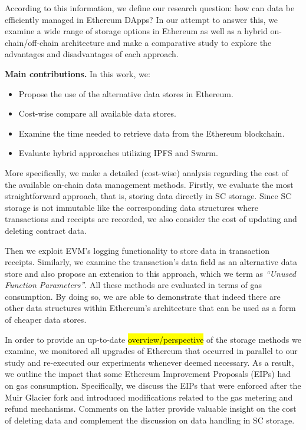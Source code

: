 According to this information, we define our research question: how can data be efficiently managed in Ethereum DApps?
In our attempt to answer this, we examine a wide range of storage options in Ethereum as well as a hybrid on-chain/off-chain architecture and make a comparative study to explore the advantages and disadvantages of each approach. 

{\bf Main contributions.} In this work, we:
\begin{itemize}[topsep=0pt, itemsep=0pt]
\item{Propose the use of the alternative data stores in Ethereum.}
\item{Cost-wise compare all available data stores.}
\item{Examine the time needed to retrieve data from the Ethereum blockchain.}
\item{Evaluate hybrid approaches utilizing IPFS and Swarm.}
\end{itemize}

More specifically, we make a detailed (cost-wise) analysis regarding the cost of the available on-chain data management methods. Firstly, we evaluate the most straightforward approach, that is, storing data directly in SC storage. Since SC storage is not immutable like the corresponding data structures where transactions and receipts are recorded, we also consider the cost of updating and deleting contract data. 

Then we exploit EVM’s logging functionality to store data in transaction receipts. Similarly, we examine the transaction's data field as an alternative data store and also propose an extension to this approach, which we term as \emph{``Unused Function Parameters''}. All these methods are evaluated in terms of gas consumption. By doing so, we are able to demonstrate that indeed there are other data structures within Ethereum’s architecture that can be used as a form of cheaper data stores.


In order to provide an up-to-date \hl{overview/perspective} of the storage methods we examine, we monitored all upgrades of Ethereum that occurred in parallel to our study and re-executed our experiments whenever deemed necessary. As a result, we outline the impact that some Ethereum Improvement Proposals (EIPs) had on gas consumption. Specifically, we discuss the EIPs that were enforced after the Muir Glacier fork and introduced modifications related to the gas metering and refund mechanisms. Comments on the latter provide valuable insight on the cost of deleting data and complement the discussion on data handling in SC storage.

